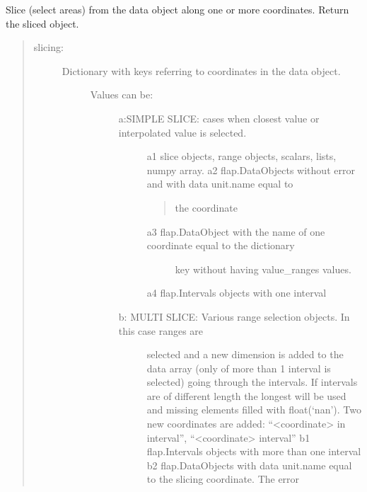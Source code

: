 \documentclass[letterpaper,10pt,english]{sphinxmanual}
\begin{document}
\begin{fulllineitems}
\begin{fulllineitems}
\end{fulllineitems}


\begin{fulllineitems}
\label{\detokenize{data_object:flap.data_object.DataObject.slice_data}}
Slice (select areas) from the data object along one or more coordinates.
Return the sliced object.
\begin{quote}
\begin{description}
\item[{slicing:}] \leavevmode\begin{description}
\item[{Dictionary with keys referring to coordinates in the data object.}] \leavevmode\begin{description}
\item[{Values can be:}] \leavevmode\begin{description}
\item[{a:SIMPLE SLICE: cases when closest value or interpolated value is selected.}] \leavevmode
a1 slice objects, range objects, scalars, lists, numpy array.
a2 flap.DataObjects without error and with data unit.name equal to
\begin{quote}

the coordinate
\end{quote}
\begin{description}
\item[{a3 flap.DataObject with the name of one coordinate equal to the dictionary}] \leavevmode
key without having value\_ranges values.

\end{description}

a4 flap.Intervals objects with one interval

\item[{b: MULTI SLICE: Various range selection objects. In this case ranges are}] \leavevmode
selected and a new dimension is added to the data array
(only of more than 1 interval is selected) going through the
intervals. If intervals are of different length the longest will be used
and missing elements filled with float(‘nan’).
Two new coordinates are added: “\textless{}coordinate\textgreater{} in interval”,
“\textless{}coordinate\textgreater{} interval”
b1 flap.Intervals objects with more than one interval
b2 flap.DataObjects with data unit.name equal to the slicing coordinate. The error
\begin{quote}


\end{quote}
\end{description}
\end{description}
\end{description}
\end{description}
\end{quote}
\end{fulllineitems}
\end{fulllineitems}
\end{document}
